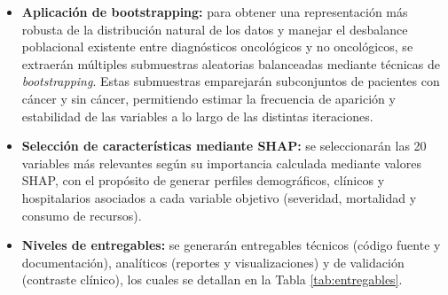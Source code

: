 \begin{itemize}
\item \textbf{Aplicación de bootstrapping:} para obtener una representación más robusta de la distribución natural de los datos y manejar el desbalance poblacional existente entre diagnósticos oncológicos y no oncológicos, se extraerán múltiples submuestras aleatorias balanceadas mediante técnicas de \textit{bootstrapping}. Estas submuestras emparejarán subconjuntos de pacientes con cáncer y sin cáncer, permitiendo estimar la frecuencia de aparición y estabilidad de las variables a lo largo de las distintas iteraciones.

\item \textbf{Selección de características mediante SHAP:} se seleccionarán las 20 variables más relevantes según su importancia calculada mediante valores SHAP, con el propósito de generar perfiles demográficos, clínicos y hospitalarios asociados a cada variable objetivo (severidad, mortalidad y consumo de recursos).

\item \textbf{Niveles de entregables:} se generarán entregables técnicos (código fuente y documentación), analíticos (reportes y visualizaciones) y de validación (contraste clínico), los cuales se detallan en la Tabla \ref{tab:entregables}.

\end{itemize}


